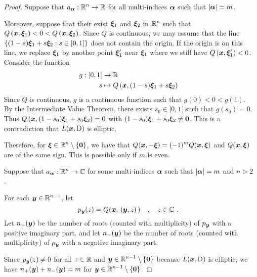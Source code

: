 \begin{proof}
 Suppose that $\displaystyle a_{{\bm{\alpha}}}:\mathbb{R}^n\rightarrow \mathbb{R}$
for all multi-indices ${\bm{\alpha}}$ such that $|{\bm{\alpha}}|=m$.

Moreover, suppose that their exist ${\bm{\xi}}_1$ and ${\bm{\xi}}_2$ in
$\displaystyle \mathbb{R}^n$ such that
$\displaystyle Q\left({\bm{x}}, {\bm{\xi}}_1\right) < 0 <
Q\left({\bm{x}}, {\bm{\xi}}_2\right)$.  Since $Q$ is continuous, we may
assume that the line
$\displaystyle \left\{ (1-s){\bm{\xi}}_1 + s{\bm{\xi}}_2 : s \in [0,1] \right\}$
does not contain the origin.  If the origin is on this line, we
replace ${\bm{\xi}}_1$ by another point ${\bm{\xi}}_1'$ near
${\bm{\xi}}_1$ where we still have
$Q\left({\bm{x}}, {\bm{\xi}}_1'\right) < 0$.  Consider the function
\begin{align*}
g:[0,1] &\rightarrow \mathbb{R} \\
s &\mapsto Q\left({\bm{x}}, (1-s){\bm{\xi}}_1 + s{\bm{\xi}}_2\right)
\end{align*}
Since $Q$ is continuous, $g$ is a continuous function such that
$g(0)<0<g(1)$.  By the Intermediate Value Theorem, there exists
$s_0 \in ]0,1[$ such that $g(s_0)=0$.  Thus
$\displaystyle
Q\left({\bm{x}}, (1-s_0){\bm{\xi}}_1 + s_0{\bm{\xi}}_2\right) = 0$
with $\displaystyle (1-s_0){\bm{\xi}}_1 + s_0{\bm{\xi}}_2 \neq {\bm{0}}$.
This is a contradiction that $L({\bm{x}}, \operatorname{D})$ is elliptic.

Therefore, for
$\displaystyle {\bm{\xi}} \in \mathbb{R}^n \setminus \{{\bm{0}}\}$, we have
that $\displaystyle Q({\bm{x}}, -{\bm{\xi}}) = (-1)^mQ({\bm{x}}, {\bm{\xi}})$
and $\displaystyle Q({\bm{x}}, {\bm{\xi}})$ are of the same sign.  This
is possible only if $m$ is even.

 Suppose that
$\displaystyle a_{{\bm{\alpha}}}:\mathbb{R}^n\rightarrow \mathbb{C}$ for some
multi-indices ${\bm{\alpha}}$ such that $|{\bm{\alpha}}|=m$ and $n>2$.

For each $\displaystyle {\bm{y}} \in \mathbb{R}^{n-1}$, let
\[
p_{{\bm{y}}}(z) = Q({\bm{x}}, \,({\bm{y}},z)\,) \quad , \quad z \in \mathbb{C} \ .
\]
Let $n_+({\bm{y}})$ be the number of roots (counted with multiplicity)
of $p_{{\bm{y}}}$ with a positive imaginary part, and let $n_-({\bm{y}})$ be
the number of roots (counted with multiplicity) of $p_{{\bm{y}}}$ with
a negative imaginary part.

Since $p_{{\bm{y}}}(z) \neq 0$ for all $z\in \mathbb{R}$ and
$\displaystyle {\bm{y}} \in \mathbb{R}^{n-1}\setminus \{{\bm{0}}\}$ because
$L({\bm{x}},\operatorname{D})$ is elliptic, we have $n_+({\bm{y}})+n_-({\bm{y}})=m$
for $\displaystyle {\bm{y}} \in \mathbb{R}^{n-1}\setminus \{{\bm{0}}\}$.


\end{proof}
